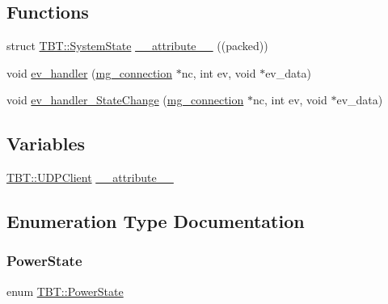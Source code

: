 \subsection*{Functions}
\begin{DoxyCompactItemize}
\item 
struct \hyperlink{structTBT_1_1SystemState}{T\+B\+T\+::\+System\+State} \hyperlink{namespaceTBT_a024865ff220c7dd9f7def06e2a61c13f_a024865ff220c7dd9f7def06e2a61c13f}{\+\_\+\+\_\+attribute\+\_\+\+\_\+} ((packed))
\item 
void \hyperlink{namespaceTBT_ab2294a8ec1c676b81a8cd10a13a24828_ab2294a8ec1c676b81a8cd10a13a24828}{ev\+\_\+handler} (\hyperlink{structmg__connection}{mg\+\_\+connection} $\ast$nc, int ev, void $\ast$ev\+\_\+data)
\item 
void \hyperlink{namespaceTBT_a13e3d1dea391b442301a95d5bca72caf_a13e3d1dea391b442301a95d5bca72caf}{ev\+\_\+handler\+\_\+\+State\+Change} (\hyperlink{structmg__connection}{mg\+\_\+connection} $\ast$nc, int ev, void $\ast$ev\+\_\+data)
\end{DoxyCompactItemize}
\subsection*{Variables}
\begin{DoxyCompactItemize}
\item 
\hyperlink{classTBT_1_1UDPClient}{T\+B\+T\+::\+U\+D\+P\+Client} \hyperlink{namespaceTBT_a625f01f6d8d0db8cd557bae99d0a8ae0_a625f01f6d8d0db8cd557bae99d0a8ae0}{\+\_\+\+\_\+attribute\+\_\+\+\_\+}
\end{DoxyCompactItemize}


\subsection{Enumeration Type Documentation}
\mbox{\label{namespaceTBT_a05cc33b74a68fb6eaf5962b5979716d4_a05cc33b74a68fb6eaf5962b5979716d4}} 
\subsubsection{\texorpdfstring{Power\+State}{PowerState}}
{\footnotesize\ttfamily enum \hyperlink{namespaceTBT_a05cc33b74a68fb6eaf5962b5979716d4_a05cc33b74a68fb6eaf5962b5979716d4}{T\+B\+T\+::\+Power\+State}}

